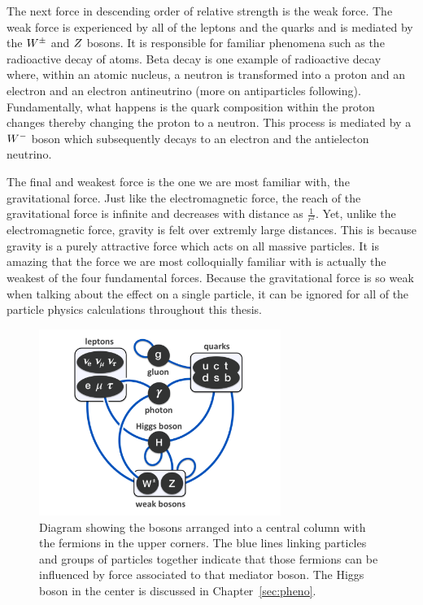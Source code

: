 The next force in descending order of relative strength is the weak force.
The weak force is experienced by
all of the leptons and the quarks and is mediated by the $W^{\pm}$ and $Z$ 
bosons. It is responsible for familiar phenomena such as the radioactive decay of atoms. 
Beta decay is one example of radioactive decay where, within an atomic nucleus,
a neutron is transformed into a proton and an electron and an electron antineutrino
(more on antiparticles following). Fundamentally, what happens
is the quark composition within the proton changes thereby changing the proton to a
neutron. This process is mediated by a $W^{-}$ boson which subsequently decays
to an electron and the antielecton neutrino.

The final and weakest force is the one we are most familiar with, the gravitational
force. Just like the electromagnetic force, the reach of the gravitational force 
is infinite and decreases with distance as $\frac{1}{r^{2}}$. Yet, unlike the
electromagnetic force, gravity is felt over extremly large distances. This is because
gravity is a purely attractive force which acts on all massive particles.
It is amazing that the force we are most colloquially familiar with is actually the
weakest of the four fundamental forces. Because the gravitational force is so weak
when talking about the effect on a single particle, it can be ignored for
all of the particle physics calculations throughout this thesis.

\begin{figure}[htbp]
\centering
     \includegraphics[width=0.7\textwidth]{introduction/plots/elementary_particle_interactions_SM.pdf}
     \caption{
Diagram showing the bosons arranged into a central column with the fermions in the
upper corners. The blue lines linking particles and groups of particles together
indicate that those fermions can be influenced by force associated to that mediator
boson. The Higgs boson in the center is discussed in Chapter~\ref{sec:pheno}.
     }
     \label{fig:sm_particles}
\end{figure}

